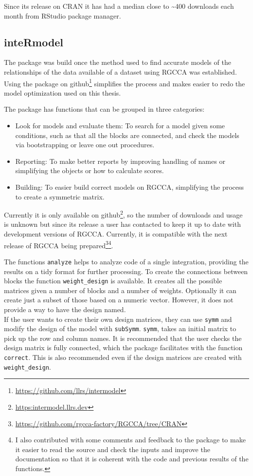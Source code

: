 \documentclass[
  12pt,
  a4paper,
  twoside,
  openright]{book}
\DeclareRobustCommand{\href}[2]{#2\footnote{\url{#1}}}
\begin{document}
Since its release on CRAN it has had a median close to \textasciitilde400 downloads each month from RStudio package manager.

\hypertarget{intermodel}{%
\subsection{inteRmodel}\label{intermodel}}

The package was build once the method used to find accurate models of the relationships of the data available of a dataset using RGCCA was established.
Using the package \href{https://github.com/llrs/intermodel}{on github} simplifies the process and makes easier to redo the model optimization used on this thesis.

The package has functions that can be grouped in three categories:

\begin{itemize}
\item
  Look for models and evaluate them:
  To search for a model given some conditions, such as that all the blocks are connected, and check the models via bootstrapping or leave one out procedures.
\item
  Reporting: To make better reports by improving handling of names or simplifying the objects or how to calculate scores.
\item
  Building: To easier build correct models on RGCCA, simplifying the process to create a symmetric matrix.
\end{itemize}

Currently it is only \href{https:intermodel.llrs.dev}{available on github}, so the number of downloads and usage is unknown but since its release a user has contacted to keep it up to date with development versions of RGCCA.
Currently, it is compatible with the next release of \href{https://github.com/rgcca-factory/RGCCA/tree/CRAN}{RGCCA being prepared}\footnote{I also contributed with some comments and feedback to the package to make it easier to read the source and check the inputs and improve the documentation so that it is coherent with the code and previous results of the functions.}.

The functions \texttt{analyze} helps to analyze code of a single integration, providing the results on a tidy format for further processing.
To create the connections between blocks the function \texttt{weight\_design} is available.
It creates all the possible matrices given a number of blocks and a number of weights.
Optionally it can create just a subset of those based on a numeric vector.
However, it does not provide a way to have the design named.\\
If the user wants to create their own design matrices, they can use \texttt{symm} and modify the design of the model with \texttt{subSymm}.
\texttt{symm}, takes an initial matrix to pick up the row and column names.
It is recommended that the user checks the design matrix is fully connected, which the package facilitates with the function \texttt{correct}.
This is also recommended even if the design matrices are created with \texttt{weight\_design}.
\end{document}
